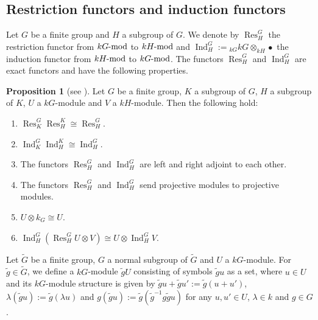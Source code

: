 \documentclass[pdftex,a4paper]{article}
\numberwithin{equation}{subsection}
\theoremstyle{definition}
\newtheorem{proposition}[theorem]{Proposition}
\newcommand{\lmod}{\operatorname{\mathrm{\hspace{-2pt}-mod}}}
\newcommand{\induc}{{\operatorname{Ind}\nolimits}}
\newcommand{\restr}{{\operatorname{Res}\nolimits}}
\begin{document}
\subsection{Restriction functors and induction functors}
Let \(G\) be a finite group and \(H\) a subgroup of \(G\).
We denote by \(\restr_{H}^G\) the restriction functor from \(kG\lmod\) to \(kH\lmod\) and \(\induc_H^G:={}_{kG}kG\otimes _{kH} \bullet\) the induction functor from \(kH\lmod\) to \(kG\lmod\).
The functors \(\restr_{H}^G\) and \(\induc_H^G\) are exact functors and have the following properties.
\begin{proposition}[{see \cite[Lemma 8.5, Lemma 8.6]{MR860771}}]\label{Theorem: Frobenius and projective}
	Let \(G\) be a finite group, \(K\) a subgroup of \(G\), \(H\) a subgroup of \(K\), \(U\) a \(kG\)-module and \(V\) a \(kH\)-module.
	Then the following hold:
	\begin{enumerate}
		\item \(\restr^G_K\restr^K_H \cong\restr^G_H\).
		\item \(\induc^G_K\induc^K_H \cong\induc^G_H\).
		\item The functors \(\restr_H^G\) and \(\induc_H^G\) are left and right adjoint to each other.
		\item The functors \(\restr_H^G\) and \(\induc_H^G\) send projective modules to projective modules.
		\item \(U\otimes k_G\cong U\).\label{triv tensor 2021-12-06 10:47:29}
		\item \(\induc_H^G(\restr_H^G U\otimes V)\cong U\otimes \induc_H^G V\).\label{frob tensor 2021-12-06 10:50:14}
	\end{enumerate}
\end{proposition}

Let \(\tilde{G}\) be a finite group, \(G\) a normal subgroup of \(\tilde{G}\) and \(U\) a \(kG\)-module. For \(\tilde{g} \in \tilde{G}\), we define a \(kG\)-module \(\tilde{g}U\) consisting of symbols \(\tilde{g}u\) as a set, where \(u\in U\) and its \(kG\)-module structure is given by \(\tilde{g}u+\tilde{g}u':=\tilde{g}(u+u')\), \(\lambda(\tilde{g}u):=\tilde{g}(\lambda u)\) and \(g(\tilde{g}u):=\tilde{g}(\tilde{g}^{-1}g\tilde{g}u) \) for any \(u, u'\in U\), \(\lambda\in k\) and \(g \in G\).
\end{document}
